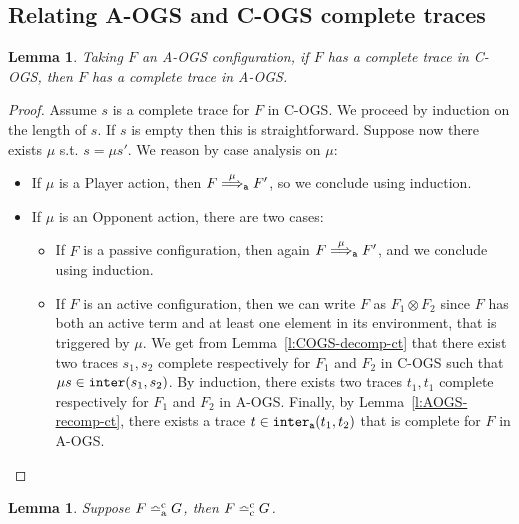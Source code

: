 \documentclass[11pt,a4paper]{amsart}
\theoremstyle{plain}
\theoremstyle{definition}
\theoremstyle{defC}
\theoremstyle{thmC}
\theoremstyle{plain}
\numberwithin{equation}{section}
\newcommand{\trace}{s}
\newcommand{\tr}{s}
\newcommand{\tracerho}{t}
\newcommand{\AOGS}{\mbox{{\rm A-OGS}}\xspace}      %
\newcommand{\COGS}{\mbox{{\rm C-OGS}}\xspace}      %
\newcommand{\rmm}[1]{{\tt{\lowercase{#1}}}}
\newcommand{\genArr}[2]{\mathrel{\stackrel{{#1}}{\Longrightarrow}_{\rmm{\lowercase{#2}}}}}  %
\newcommand{\ArrA}[1]{\genArr{#1}{A}}  %
\newcommand{\genTEcomp}[1]{\mathrel{\bumpeq^{\rm c}_{\rm{\lowercase{#1}}}}} %
\newcommand{\TEc}{\genTEcomp{A}}        %
\newcommand{\TEpc}{\genTEcomp{C}}        %
\newcommand{\interl}[2]{{\tt inter}( #1, #2)}
\newcommand{\interlA}[2]{{\tt inter_{a}}( #1, #2)}
\newcommand{\FF}{F}
\newcommand{\GG}{G}
\theoremstyle{plain}
\newtheorem{lemma}[thm]{Lemma}
\theoremstyle{definition}
\begin{document}
\subsection{Relating \AOGS and \COGS complete traces}
\label{a:aogs-cogs-complete}


\begin{lemma}
\label{l:CtoCA}
Taking $\FF$ an \AOGS configuration,
if $\FF$ has a complete trace in \COGS, then $\FF$ 
has a complete trace in \AOGS. 
\end{lemma}

\begin{proof}
Assume $\trace $ is a complete trace
for $\FF$ in \COGS.
We proceed by induction on the length of $\trace $.
If $\trace$ is empty then this is straightforward.
Suppose now there exists $\mu$ s.t. 
$\trace = \mu \tr'$. We reason by case analysis on $\mu$:
\begin{itemize}
\item If $\mu$ is a Player action,
then $\FF \ArrA \mu \FF'$, so we conclude using induction.
\item If $\mu$ is an Opponent action,
there are two cases:
\begin{itemize}
\item If $\FF$ is a passive configuration, 
then again $\FF \ArrA \mu \FF'$, and we conclude using induction.
\item If $\FF$ is an active configuration, then we can write
$\FF$ as $\FF_1 \otimes \FF_2$ since $\FF$ has both
an active term and at least one element in its environment,
that is triggered by $\mu$.
We get from Lemma~\ref{l:COGS-decomp-ct}
that there exist two traces $\trace_1,\trace_2$ complete respectively for
$\FF_1$ and $\FF_2$ in \COGS such that $\mu \trace \in \interl{\trace_1}{\trace_2}$.
By induction, there exists two traces $\tracerho_1,\tracerho_1$ 
complete respectively for $\FF_1$ and $\FF_2$ in \AOGS.
%
Finally,
by Lemma~\ref{l:AOGS-recomp-ct}, there exists a trace
$\tracerho \in \interlA{\tracerho_1}{\tracerho_2}$
that is complete for $\FF$ in \AOGS.
\qedhere
\end{itemize}
\end{itemize}
\end{proof} 

\begin{lemma}
\label{l:mainCC-CA}
Suppose 
$\FF  \TEc \GG$,
then
$\FF  \TEpc \GG$.
\end{lemma}   
\end{document}
